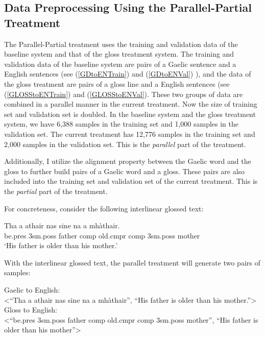 \documentclass[final]{ua-thesis}
\numberwithin{equation}{section}
\begin{document}
\subsection{Data Preprocessing Using the Parallel-Partial Treatment}
The Parallel-Partial treatment uses the training and validation data of the baseline system and that of the gloss treatment system.  
The training and validation data of the baseline system are pairs of a Gaelic sentence and a English sentences (see (\ref{GDtoENTrain}) and (\ref{GDtoENVal}) ), 
and the data of the gloss treatment are pairs of a gloss line and a English sentences (see (\ref{GLOSStoENTrain}) and (\ref{GLOSStoENVal}). 
These two groups of data are combined in a parallel manner in the current treatment. Now the size of training set and validation set is doubled. In the baseline system and the gloss treatment system, we have 6,388 samples in the training set and 1,000 samples in the validation set. The current treatment has 12,776 samples in the training set and 2,000 samples in the validation set. This is the \textit{parallel} part of the treatment. 

Additionally, I utilize the alignment property between the Gaelic word and the gloss to further build pairs of a Gaelic word and a gloss. These pairs are also included into the training set and validation set of the current treatment. This is the \textit{partial} part of the treatment.   

For concreteness, consider the following interlinear glossed text: 
\begin{exe}  
\ex \gll    Tha a athair nas sine na a mh\`athair.\\  
            be.pres 3sm.poss father comp old.cmpr comp 3sm.poss mother\\  
    \glt    `His father is older than his mother.'  
\end{exe}

With the interlinear glossed text, the parallel treatment will generate two pairs of samples:

\begin{exe}
	\ex
	\begin{xlist}
		\ex Gaelic to English: \\<``Tha a athair nas sine na a mh\`athair'', ``His father is older than his mother.''>
		\ex Gloss to English: \\<``be.pres 3sm.poss father comp old.cmpr comp 3sm.poss mother'', ``His father is older than his mother''>
	\end{xlist}
\end{exe}
\end{document}
